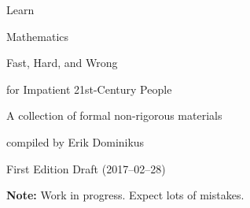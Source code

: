 \begin{titlingpage}
{
\selectfont
\setlength\parindent{0em}
\setlength\parskip{0em}
{\fontsize{63pt}{72pt}\selectfont Learn\par Mathematics\par}\vspace{2em}
{\fontsize{36pt}{36pt}\selectfont Fast, Hard, and Wrong\par}\vspace{2em}
{\fontsize{24pt}{24pt}\selectfont for Impatient 21st-Century People\par}
\vfill
{\fontsize{18pt}{27pt}\selectfont A collection of formal non-rigorous materials\par compiled by Erik Dominikus\par\vspace{2em}}
{\fontsize{18pt}{18pt}\selectfont First Edition Draft (2017--02--28)\par}
{\fontsize{12pt}{12pt}\selectfont\vspace{3em}\textbf{Note:} Work in progress. Expect lots of mistakes.}
}
\end{titlingpage}
\restoregeometry

